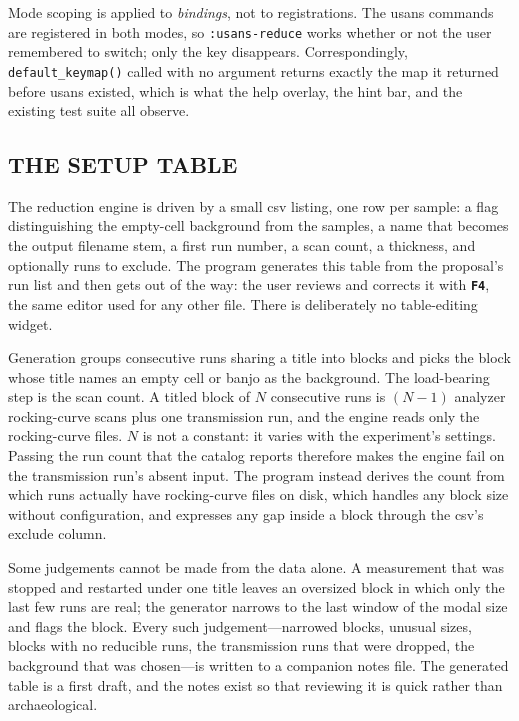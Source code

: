 \documentclass[tm]{ornltm}
\newcommand{\key}[1]{\textbf{\texttt{#1}}}
\begin{document}
Mode scoping is applied to \emph{bindings}, not to registrations. The
\ac{usans} commands are registered in both modes, so \texttt{:usans-reduce}
works whether or not the user remembered to switch; only the key disappears.
Correspondingly, \texttt{default\_keymap()} called with no argument returns
exactly the map it returned before \ac{usans} existed, which is what the help
overlay, the hint bar, and the existing test suite all observe.

\subsection{THE SETUP TABLE}

The reduction engine is driven by a small \ac{csv} listing, one row per sample:
a flag distinguishing the empty-cell background from the samples, a name that
becomes the output filename stem, a first run number, a scan count, a thickness,
and optionally runs to exclude. The program generates this table from the
proposal's run list and then gets out of the way: the user reviews and corrects
it with \key{F4}, the same editor used for any other file. There is deliberately
no table-editing widget.

Generation groups consecutive runs sharing a title into blocks and picks the
block whose title names an empty cell or banjo as the background. The
load-bearing step is the scan count. A titled block of $N$ consecutive runs is
$(N-1)$ analyzer rocking-curve scans plus one transmission run, and the engine
reads only the rocking-curve files. $N$ is not a constant: it varies with the
experiment's settings. Passing the run count that the catalog reports therefore
makes the engine fail on the transmission run's absent input. The program instead
derives the count from which runs actually have rocking-curve files on disk,
which handles any block size without configuration, and expresses any gap inside
a block through the \ac{csv}'s exclude column.

Some judgements cannot be made from the data alone. A measurement that was
stopped and restarted under one title leaves an oversized block in which only
the last few runs are real; the generator narrows to the last window of the modal
size and flags the block. Every such judgement---narrowed blocks, unusual sizes,
blocks with no reducible runs, the transmission runs that were dropped, the
background that was chosen---is written to a companion notes file. The generated
table is a first draft, and the notes exist so that reviewing it is quick rather
than archaeological.
\end{document}
